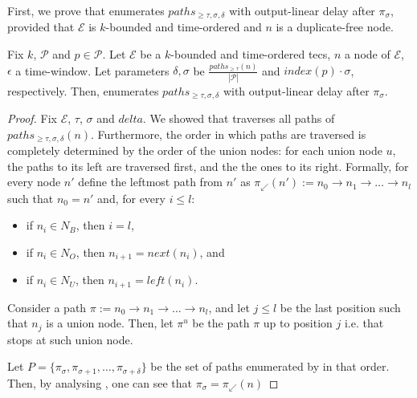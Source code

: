 First, we prove that  enumerates $paths_{\ge \tau, \sigma, \delta}$ with output-linear delay after $\pi_{\sigma}$, provided that $\mathcal{E}$ is $k$-bounded and time-ordered and $n$ is a duplicate-free node.

\begin{lemma}\label{lemma:enumeration:process}
  Fix $k$, $\mathcal{P}$ and $p \in \mathcal{P}$. Let $\mathcal{E}$ be a $k$-bounded and time-ordered \acrshort{tecs}, $n$ a node of $\mathcal{E}$, $\epsilon$ a time-window. Let parameters $\delta, \sigma$ be $\frac{paths_{\ge \tau}(n)}{|\mathcal{P}|}$ and $index(p) \cdot \sigma$, respectively. Then,  enumerates $paths_{\ge \tau, \sigma, \delta}$ with output-linear delay after $\pi_{\sigma}$.
\end{lemma}

\begin{proof}
  Fix $\mathcal{E}$, $\tau$, $\sigma$ and $delta$. We showed that  traverses all paths of $paths_{\ge \tau, \sigma, \delta}(n)$. Furthermore, the order in which paths are traversed is completely determined by the order of the union nodes: for each union node $u$, the paths to its left are traversed first, and the the ones to its right. Formally, for every node $n'$ define the leftmost path from $n'$ as $\pi_{\swarrow}(n') := n_{0} \rightarrow n_{1} \rightarrow \ldots \rightarrow n_{l}$ such that $n_{0} = n'$ and, for every $i \le l$:
  \begin{itemize}
      \item if $n_{i} \in N_{B}$, then $i = l$,
      \item if $n_{i} \in N_{O}$, then $n_{i+1} = next(n_{i})$, and
      \item if $n_{i} \in N_{U}$, then $n_{i+1} = left(n_{i})$.
  \end{itemize}
  Consider a path $\pi := n_{0} \rightarrow n_{1} \rightarrow \ldots \rightarrow n_{l}$, and let $j \leq l$ be the last position such that $n_{j}$ is a union node. Then, let $\pi^{u}$ be the path $\pi$ up to position $j$ i.e. that stops at such union node.

  Let $P = \{\pi_{\sigma}, \pi_{\sigma+1}, \ldots, \pi_{\sigma+\delta}\}$ be the set of paths enumerated by  in that order. Then, by analysing , one can see that $\pi_{\sigma} = \pi_{\swarrow}(n)$

\end{proof}

